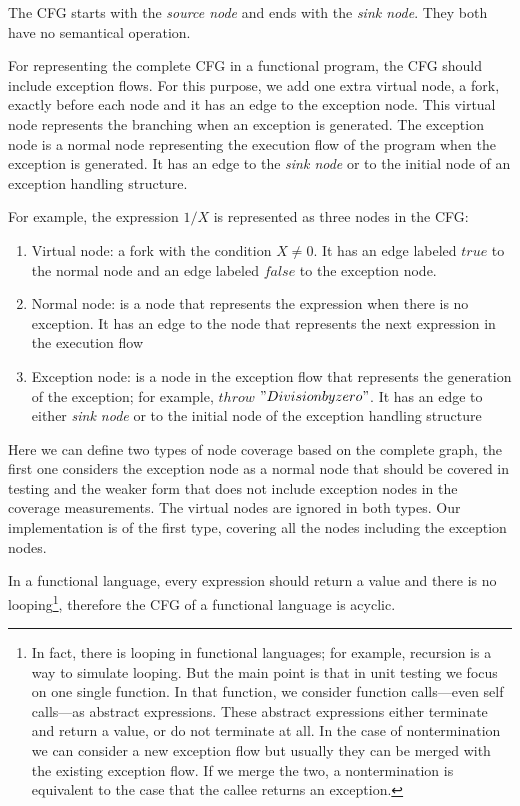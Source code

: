 \documentclass[12pt,a4paper]{report}
\begin{document}
The CFG starts with the \emph{source node} and ends with the \emph{sink node}. They both have no semantical operation.

For representing the complete CFG in a functional program, the CFG should include exception flows. For this purpose, we add one extra virtual node, a fork, exactly before each node and it has an edge to the exception node. This virtual node represents the branching when an exception is generated. The exception node is a normal node representing the execution flow of the program when the exception is generated. It has an edge to the \emph{sink node} or to the initial node of an exception handling structure. 

For example, the expression $1/X$ is represented as three nodes in the CFG:
\begin{enumerate}
 \item Virtual node: a fork with the condition $X\neq0$. It has an edge labeled $true$ to the normal node and an edge labeled $false$ to the exception node.
 \item Normal node: is a node that represents the expression when there is no exception. It has an edge to the node that represents the next expression in the execution flow
 \item Exception node: is a node in the exception flow that represents the generation of the exception; for example, $throw$ $"Division by zero"$. It has an edge to either \emph{sink node} or to the initial node of the exception handling structure
\end{enumerate}

Here we can define two types of node coverage based on the complete graph, the first one considers the exception node as a normal node that should be covered in testing and the weaker form that does not include exception nodes in the coverage measurements. The virtual nodes are ignored in both types. Our implementation is of the first type, covering all the nodes including the exception nodes.

In a functional language, every expression should return a value and there is no looping\footnote{In fact, there is looping in functional languages; for example, recursion is a way to simulate looping. But the main point is that in unit testing we focus on one single function. In that function, we consider function calls---even self calls---as abstract expressions. These abstract expressions either terminate and return a value, or do not terminate at all. In the case of nontermination we can consider a new exception flow but usually they can be merged with the existing exception flow. If we merge the two, a nontermination is equivalent to the case that the callee returns an exception.}, therefore the CFG of a functional language is acyclic.
\end{document}

